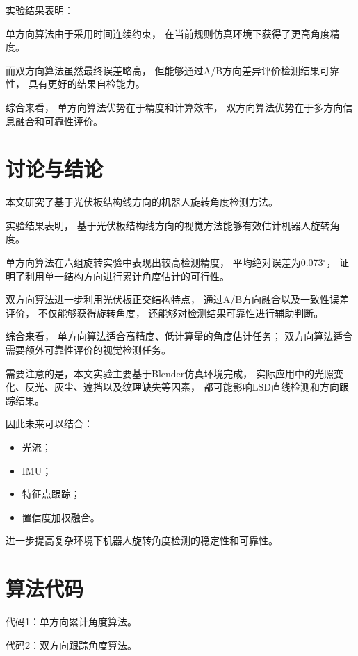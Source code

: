 \documentclass[UTF8,a4paper,12pt]{ctexart}
\begin{document}
	实验结果表明： 
	
	单方向算法由于采用时间连续约束， 
	在当前规则仿真环境下获得了更高角度精度。 
	
	而双方向算法虽然最终误差略高， 
	但能够通过A/B方向差异评价检测结果可靠性， 
	具有更好的结果自检能力。 
	
	综合来看， 
	单方向算法优势在于精度和计算效率， 
	双方向算法优势在于多方向信息融合和可靠性评价。 
	
	\FloatBarrier 
	
	\section{讨论与结论} 
	
	本文研究了基于光伏板结构线方向的机器人旋转角度检测方法。 
	
	实验结果表明， 
	基于光伏板结构线方向的视觉方法能够有效估计机器人旋转角度。 
	
	单方向算法在六组旋转实验中表现出较高检测精度， 
	平均绝对误差为0.073$^\circ$， 
	证明了利用单一结构方向进行累计角度估计的可行性。 
	
	双方向算法进一步利用光伏板正交结构特点， 
	通过A/B方向融合以及一致性误差评价， 
	不仅能够获得旋转角度， 
	还能够对检测结果可靠性进行辅助判断。 
	
	综合来看， 
	单方向算法适合高精度、低计算量的角度估计任务； 
	双方向算法适合需要额外可靠性评价的视觉检测任务。 
	
	需要注意的是，本文实验主要基于Blender仿真环境完成， 
	实际应用中的光照变化、反光、灰尘、遮挡以及纹理缺失等因素， 
	都可能影响LSD直线检测和方向跟踪结果。 
	
	因此未来可以结合： 
	\begin{itemize} 
		\item 光流； 
		\item IMU； 
		\item 特征点跟踪； 
		\item 置信度加权融合。 
	\end{itemize} 
	
	进一步提高复杂环境下机器人旋转角度检测的稳定性和可靠性。 
	
	\appendix 
	\section{算法代码} 
	代码1：单方向累计角度算法。 
	
	代码2：双方向跟踪角度算法。 
	
\end{document}
